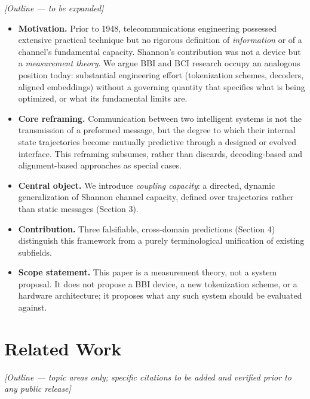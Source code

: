 \documentclass[11pt]{article}
\begin{document}
\textit{[Outline --- to be expanded]}

\begin{itemize}[leftmargin=1.2em]
    \item \textbf{Motivation.} Prior to 1948, telecommunications engineering possessed extensive practical technique but no rigorous definition of \emph{information} or of a channel's fundamental capacity. Shannon's contribution was not a device but a \emph{measurement theory}. We argue BBI and BCI research occupy an analogous position today: substantial engineering effort (tokenization schemes, decoders, aligned embeddings) without a governing quantity that specifies what is being optimized, or what its fundamental limits are.
    \item \textbf{Core reframing.} Communication between two intelligent systems is not the transmission of a preformed message, but the degree to which their internal state trajectories become mutually predictive through a designed or evolved interface. This reframing subsumes, rather than discards, decoding-based and alignment-based approaches as special cases.
    \item \textbf{Central object.} We introduce \emph{coupling capacity}: a directed, dynamic generalization of Shannon channel capacity, defined over trajectories rather than static messages (Section 3).
    \item \textbf{Contribution.} Three falsifiable, cross-domain predictions (Section 4) distinguish this framework from a purely terminological unification of existing subfields.
    \item \textbf{Scope statement.} This paper is a measurement theory, not a system proposal. It does not propose a BBI device, a new tokenization scheme, or a hardware architecture; it proposes what any such system should be evaluated against.
\end{itemize}

\section{Related Work}

\textit{[Outline --- topic areas only; specific citations to be added and verified prior to any public release]}
\end{document}
